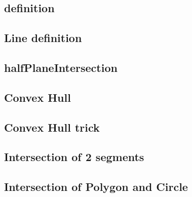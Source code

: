 \documentclass[a4paper,10pt,twocolumn,oneside]{article}
\begin{document}
\subsection{definition}


\subsection{Line definition}


% 
\subsection{halfPlaneIntersection}


\subsection{Convex Hull}


\subsection{Convex Hull trick}


%

\subsection{Intersection of 2 segments}


\subsection{Intersection of Polygon and Circle}


%
\end{document}
